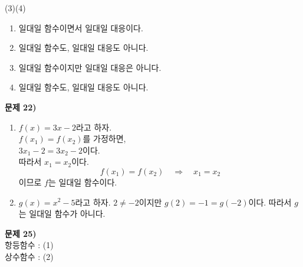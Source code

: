 \documentclass{oblivoir}
\newcounter{num}
\newcommand\an[1]{\par\bigskip\noindent\textbf{문제 #1)}\\}
\begin{document}
\begin{minipage}{0.49\textwidth}
\begin{center}
\par\noindent(3)\qquad\qquad\qquad\quad\:\:(4)
\end{center}
\begin{enumerate}[topsep=0pt]
\item
일대일 함수이면서 일대일 대응이다.
\item
일대일 함수도, 일대일 대응도 아니다.
\item
일대일 함수이지만 일대일 대응은 아니다.
\item
일대일 함수도, 일대일 대응도 아니다.
\end{enumerate}
\end{minipage}

\begin{minipage}{0.49\textwidth}
%
\an{22}
\begin{enumerate}[topsep=0pt]
\item
\(f(x)=3x-2\)라고 하자.\\
\(f(x_1)=f(x_2)\)를 가정하면,\\ \(3x_1-2=3x_2-2\)이다.\\
따라서 \(x_1=x_2\)이다.
\[f(x_1)=f(x_2)\quad\Rightarrow\quad x_1=x_2\]
이므로 \(f\)는 일대일 함수이다.
\item
\(g(x)=x^2-5\)라고 하자.
\(2\neq-2\)이지만 \(g(2)=-1=g(-2)\)이다.
따라서 \(g\)는 일대일 함수가 아니다.
\end{enumerate}

%
\an{25}
항등함수 : (1)\\ 상수함수 : (2)


\end{minipage}
\end{document}
